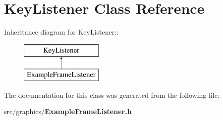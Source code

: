 \section{Key\-Listener Class Reference}
\label{classKeyListener}
Inheritance diagram for Key\-Listener::\begin{figure}[H]
\begin{center}
\leavevmode
\includegraphics[height=2cm]{classKeyListener}
\end{center}
\end{figure}


The documentation for this class was generated from the following file:\begin{CompactItemize}
\item 
src/graphics/{\bf Example\-Frame\-Listener.h}\end{CompactItemize}
